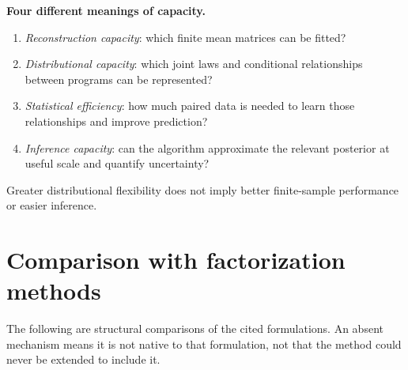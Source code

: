 \documentclass[11pt,a4paper]{article}
\numberwithin{equation}{section}
\begin{document}
\textbf{Four different meanings of capacity.}
\begin{enumerate}
\item \emph{Reconstruction capacity}: which finite mean matrices can be fitted?
\item \emph{Distributional capacity}: which joint laws and conditional
relationships between programs can be represented?
\item \emph{Statistical efficiency}: how much paired data is needed to learn
those relationships and improve prediction?
\item \emph{Inference capacity}: can the algorithm approximate the relevant
posterior at useful scale and quantify uncertainty?
\end{enumerate}
Greater distributional flexibility does not imply better finite-sample
performance or easier inference.

\clearpage
\section{Comparison with factorization methods}

The following are structural comparisons of the cited formulations.
An absent mechanism means it is not native to that formulation, not that
the method could never be extended to include it.
\end{document}
